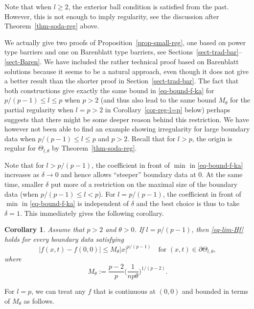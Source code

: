 \documentclass[a4paper, twoside]{article}
\theoremstyle{propositional}
\newtheorem{cor}[thm]{Corollary}
\theoremstyle{descriptive}
\numberwithin{equation}{section}
\newcommand{\de}{\delta}
\newcommand{\bdy}{\partial}
\begin{document}
Note that when $l \ge 2$,  the exterior ball condition 
is satisfied from the past. 
However, this is not
enough to imply regularity, 
see the discussion after Theorem~\ref{thm-soda-reg} above.

We actually give two proofs of Proposition~\ref{prop-small-reg},
one based on power type barriers and one on Barenblatt type barriers,
see Sections~\ref{sect-trad-bar}--\ref{sect-Baren}.
We have included the rather technical proof based on Barenblatt solutions
because it seems to be a natural approach, even though it does not give
a better result than the shorter proof in Section~\ref{sect-trad-bar}.
The fact that both  constructions give exactly the same bound
in \eqref{eq-bound-f-ka} for $p/(p-1) \le l \le p$
when $p>2$
(and thus also lead to the same bound $M_\theta$
for the partial regularity when $l=p>2$ in Corollary~\ref{cor-reg-l=p} below)
perhaps suggests that there might
be some deeper reason behind this restriction.
We have however not been able to find an example showing
irregularity for large boundary data when $p/(p-1) \le l \le p$  and $p>2$. 
Recall that for $l>p$, the origin is regular for $\Theta_{l,\theta}$ by
Theorem~\ref{thm-soda-reg}.


Note that for $l>p/(p-1)$, the coefficient in front of $\min$ in \eqref{eq-bound-f-ka}
increases as $\de\to0$ and hence allows ``steeper'' boundary data at $0$.
At the same time, smaller $\de$ put more of a restriction 
on the maximal
size of the boundary data (when $p/(p-1) \le l <p$).
For $l=p/(p-1)$, the coefficient in front of $\min$ in \eqref{eq-bound-f-ka}
is independent of $\de$ and the best choice is thus to take $\de=1$.
This immediately gives the following corollary.


\begin{cor}  \label{cor-reg-l=p/(p-1)}
Assume that $p>2$ and $\theta>0$.
If  $l= p/(p-1)$, then
\eqref{eq-lim-Hf} holds for every
boundary data satisfying
\begin{equation*} %
|f(x,t)-f(0,0)| \le M_\theta   |x|^{p/(p-1)}
\quad \text{for } (x,t) \in \bdy \Theta_{l,\theta},
\end{equation*}
where
\begin{equation}   \label{eq-M-theta}
M_\theta:=\frac {p-2}{p} \biggl(\frac{1}{np\theta}\biggr)^{1/(p-2)}.
\end{equation}
\end{cor}

For $l=p$,
we can treat any $f$ that is continuous at $(0,0)$ and 
bounded in terms of  $M_\theta$ as follows.
\end{document}
